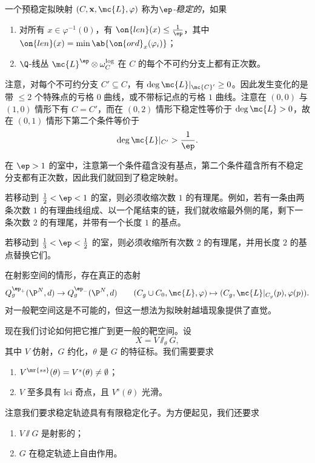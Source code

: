 \begin{defn}
    一个预稳定拟映射 \((C, \mathbf{x}, \mc{L}, \varphi)\) 称为\textit{\(\ep\)-稳定的}，如果
    \begin{enumerate}
        \item 对所有 \(x \in \varphi^{-1}(0)\)，有 \(\on{len}(x) \leq \frac{1}{\ep}\)，其中 \(\on{len}(x) = \min \ab\{ \on{ord}_x (\varphi_i)\}\)；
        \item \(\Q\)-线丛 \(\mc{L}^{\ep} \otimes \omega_C^{\log}\) 在 \(C\) 的每个不可约分支上都有正次数。
    \end{enumerate}
\end{defn}

注意，对每个不可约分支 \(C' \subseteq C\)，有 \(\deg \mc{L}|_{\mc{C}'} \geq 0\)。因此发生变化的是带 \(\leq 2\) 个特殊点的亏格 \(0\) 曲线，或不带标记点的亏格 \(1\) 曲线。注意在 \((0,0)\) 与 \((1,0)\) 情形下有 \(C = C'\)，而在 \((0,2)\) 情形下稳定性等价于 \(\deg \mc{L} > 0\)，故在 \((0,1)\) 情形下第二个条件等价于
\[ \deg \mc{L}|_{C'} > \frac{1}{\ep}. \]

\begin{exm}
    在 \(\ep > 1\) 的室中，注意第一个条件蕴含没有基点，第二个条件蕴含所有不稳定分支都有正次数，因此我们就回到了稳定映射。

    若移动到 \(\frac{1}{2} < \ep < 1\) 的室，则必须收缩次数 \(1\) 的有理尾。例如，若有一条由两条次数 \(1\) 的有理曲线组成、以一个尾结束的链，我们就收缩最外侧的尾，剩下一条次数 \(2\) 的有理尾，并带有一个长度 \(1\) 的基点。

    若移动到 \(\frac{1}{3} < \ep < \frac{1}{2}\) 的室，则必须收缩所有次数 \(2\) 的有理尾，并用长度 \(2\) 的基点替换它们。
\end{exm}

\begin{rmk}
    在射影空间的情形，存在真正的态射
    \[ Q_g^{\ep_+}(\P^N, d) \to Q_g^{\ep_-}(\P^N, d) \qquad (C_g \cup C_0, \mc{L}, \varphi) \mapsto (C_g, \mc{L}|_{C_g}(p), \varphi(p)). \]
    对一般靶空间这是不可能的，但这一想法为拟映射越墙现象提供了直觉。
\end{rmk}

现在我们讨论如何把它推广到更一般的靶空间。设
\[ X = V \sslash_{\theta} G, \]
其中 \(V\) 仿射，\(G\) 约化，\(\theta\) 是 \(G\) 的特征标。我们需要要求
\begin{enumerate}
    \item \(V^{\mr{ss}}(\theta) = V^s(\theta) \neq \emptyset\)；
    \item \(V\) 至多具有 lci 奇点，且 \(V^s(\theta)\) 光滑。
\end{enumerate}
注意我们要求稳定轨迹具有有限稳定化子。为方便起见，我们还要求
\begin{enumerate}
    \item \(V \sslash G\) 是射影的；
    \item \(G\) 在稳定轨迹上自由作用。
\end{enumerate}

